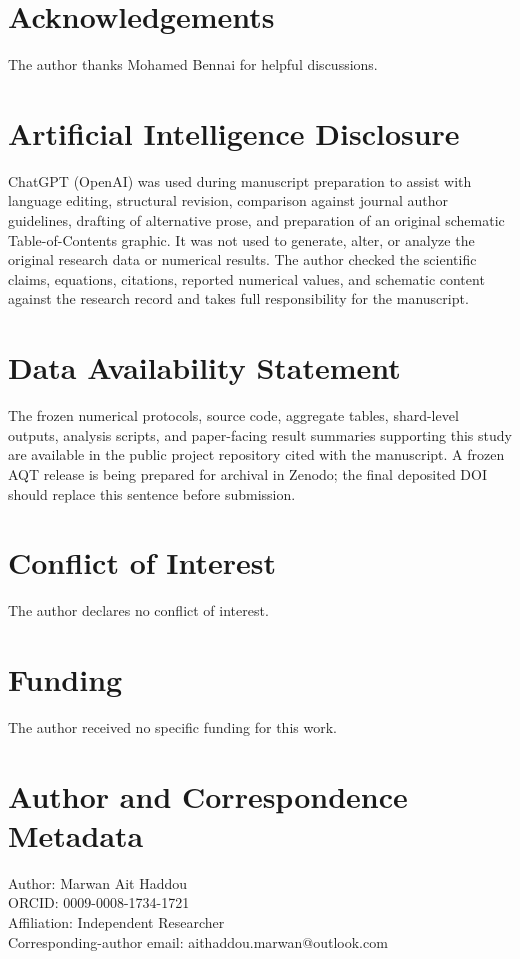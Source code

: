 
\section*{Acknowledgements}
The author thanks Mohamed Bennai for helpful discussions.

\section*{Artificial Intelligence Disclosure}
ChatGPT (OpenAI) was used during manuscript preparation to assist with language editing, structural revision, comparison against journal author guidelines, drafting of alternative prose, and preparation of an original schematic Table-of-Contents graphic. It was not used to generate, alter, or analyze the original research data or numerical results. The author checked the scientific claims, equations, citations, reported numerical values, and schematic content against the research record and takes full responsibility for the manuscript.

\section*{Data Availability Statement}
The frozen numerical protocols, source code, aggregate tables, shard-level outputs, analysis scripts, and paper-facing result summaries supporting this study are available in the public project repository cited with the manuscript. A frozen AQT release is being prepared for archival in Zenodo; the final deposited DOI should replace this sentence before submission.

\section*{Conflict of Interest}
The author declares no conflict of interest.

\section*{Funding}
The author received no specific funding for this work.

\section*{Author and Correspondence Metadata}
Author: Marwan Ait Haddou\\
ORCID: 0009-0008-1734-1721\\
Affiliation: Independent Researcher\\
Corresponding-author email: aithaddou.marwan@outlook.com

